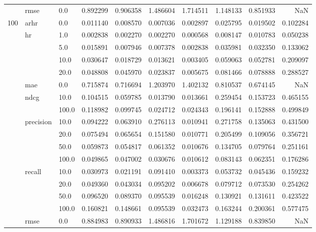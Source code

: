 \begin{tabular}{lllrrrrrrr}
    & rmse & 0.0   &  0.892299 &  0.906358 &  1.486604 &  1.714511 &  1.148133 &  0.851933 &       NaN \\
100 & arhr & 0.0   &  0.011140 &  0.008570 &  0.007036 &  0.002897 &  0.025795 &  0.019502 &  0.102284 \\
    & hr & 1.0   &  0.002838 &  0.002270 &  0.002270 &  0.000568 &  0.008147 &  0.010783 &  0.050238 \\
    &      & 5.0   &  0.015891 &  0.007946 &  0.007378 &  0.002838 &  0.035981 &  0.032350 &  0.133062 \\
    &      & 10.0  &  0.030647 &  0.018729 &  0.013621 &  0.003405 &  0.059063 &  0.052781 &  0.209097 \\
    &      & 20.0  &  0.048808 &  0.045970 &  0.023837 &  0.005675 &  0.081466 &  0.078888 &  0.288527 \\
    & mae & 0.0   &  0.715874 &  0.716694 &  1.203970 &  1.402132 &  0.810537 &  0.674145 &       NaN \\
    & ndcg & 10.0  &  0.104515 &  0.059785 &  0.013790 &  0.013661 &  0.259454 &  0.153723 &  0.465155 \\
    &      & 100.0 &  0.118982 &  0.099745 &  0.024712 &  0.024343 &  0.196141 &  0.152888 &  0.499849 \\
    & precision & 10.0  &  0.094222 &  0.063910 &  0.276113 &  0.010941 &  0.271758 &  0.135063 &  0.431500 \\
    &      & 20.0  &  0.075494 &  0.065654 &  0.151580 &  0.010771 &  0.205499 &  0.109056 &  0.356721 \\
    &      & 50.0  &  0.059873 &  0.054817 &  0.061352 &  0.010676 &  0.134705 &  0.079764 &  0.251161 \\
    &      & 100.0 &  0.049865 &  0.047002 &  0.030676 &  0.010612 &  0.083143 &  0.062351 &  0.176286 \\
    & recall & 10.0  &  0.030973 &  0.021191 &  0.091410 &  0.003373 &  0.053732 &  0.045436 &  0.159232 \\
    &      & 20.0  &  0.049360 &  0.043034 &  0.095202 &  0.006678 &  0.079712 &  0.073530 &  0.254262 \\
    &      & 50.0  &  0.096520 &  0.089370 &  0.095539 &  0.016248 &  0.130921 &  0.131611 &  0.423522 \\
    &      & 100.0 &  0.160821 &  0.148661 &  0.095539 &  0.032473 &  0.163244 &  0.200361 &  0.577475 \\
    & rmse & 0.0   &  0.884983 &  0.890933 &  1.486816 &  1.701672 &  1.129188 &  0.839850 &       NaN \\
\bottomrule
\end{tabular}
